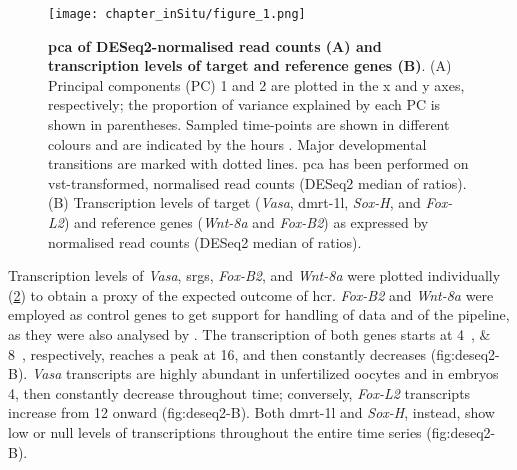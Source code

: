 \begingroup
\captionsetup[figure]{format=hruleformat}
\begin{figure}[t!]
	\centering
	\captionsetup[subfigure]{labelformat=nocaption}
	\begin{subfigure}{0\linewidth}
	\caption{}\label{fig:deseq2-A}
	\end{subfigure}%
	\begin{subfigure}{0\linewidth}
	\caption{}\label{fig:deseq2-B}
	\end{subfigure}%
    \texttt{[image: chapter\_inSitu/figure\_1.png]}
	\caption[\textbf{\gls{pca} of DESeq2-normalised read counts (A) and transcription levels of target and reference genes (B)}]
	{
		\textbf{\gls{pca} of DESeq2-normalised read counts (A) and transcription levels of target and reference genes (B)}. (A) Principal components (PC) 1 and 2 are plotted in the x and y axes, respectively; the proportion of variance explained by each PC is shown in parentheses. Sampled time-points are shown in different colours and are indicated by the hours . Major developmental transitions are marked with dotted lines. \gls{pca} has been performed on vst-transformed, normalised read counts (DESeq2 median of ratios). (B) Transcription levels of target (\textit{Vasa}, \gls{dmrt-1l}, \textit{Sox-H}, and \textit{Fox-L2}) and reference genes (\textit{Wnt-8a} and \textit{Fox-B2}) as expressed by normalised read counts (DESeq2 median of ratios).
	}
	\label{fig:deseq2}
\end{figure}
\endgroup

Transcription levels of \textit{Vasa}, \glspl{srg}, \textit{Fox-B2}, and \textit{Wnt-8a} were plotted individually (\cref{fig:deseq2-B}) to obtain a proxy of the expected outcome of \gls{hcr}. \textit{Fox-B2} and \textit{Wnt-8a} were employed as control genes to get support for handling of data and of the pipeline, as they were also analysed by . The transcription of both genes starts at \qtylist{4;8}{\hpf}, respectively, reaches a peak at \qty{16}{\hpf}, and then constantly decreases ({fig:deseq2-B}). \textit{Vasa} transcripts are highly abundant in unfertilized oocytes and in embryos \qty{4}{\hpf}, then constantly decrease throughout time; conversely, \textit{Fox-L2} transcripts increase from \qty{12}{\hpf} onward ({fig:deseq2-B}). Both \gls{dmrt-1l} and \textit{Sox-H}, instead, show low or null levels of transcriptions throughout the entire time series ({fig:deseq2-B}).

